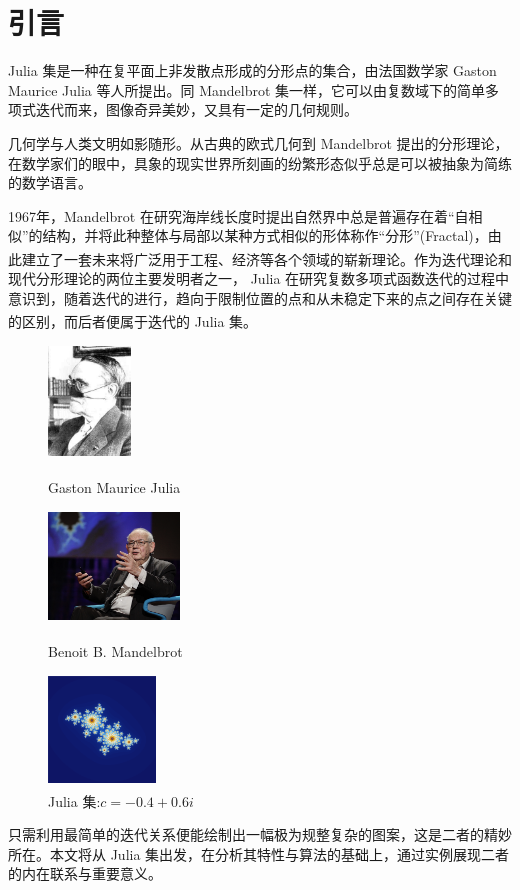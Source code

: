 \section{引言}

Julia 集是一种在复平面上非发散点形成的分形点的集合，由法国数学家 Gaston Maurice Julia 等人所提出。同 Mandelbrot 集一样，它可以由复数域下的简单多项式迭代而来，图像奇异美妙，又具有一定的几何规则。

几何学与人类文明如影随形。从古典的欧式几何到 Mandelbrot 提出的分形理论，在数学家们的眼中，具象的现实世界所刻画的纷繁形态似乎总是可以被抽象为简练的数学语言。

1967年，Mandelbrot 在研究海岸线长度时提出自然界中总是普遍存在着“自相似”的结构，并将此种整体与局部以某种方式相似的形体称作“分形”(Fractal)，由此建立了一套未来将广泛用于工程、经济等各个领域的崭新理论。\textsuperscript{\cite{enwiki-mandelbortset}}作为迭代理论和现代分形理论的两位主要发明者之一， Julia 在研究复数多项式函数迭代的过程中意识到，随着迭代的进行，趋向于限制位置的点和从未稳定下来的点之间存在关键的区别，而后者便属于迭代的 Julia 集。\textsuperscript{\cite{website-julia}}

\begin{figure}[htbp]
\centering
\begin{minipage}{0.3\linewidth}
\centering
\includegraphics[width = 2.2cm]{./images/julia.jpg}
\caption{Gaston Maurice Julia\textsuperscript{\cite{pic-julia}}}
\end{minipage}\hfill
\begin{minipage}{0.3\linewidth}
\centering
\includegraphics[width = 3.5cm]{./images/mandelbort.png}
\caption{Benoit B. Mandelbrot\textsuperscript{\cite{enwiki-mandelbort}}}
\end{minipage}\hfill
\begin{minipage}{0.35\linewidth}
\centering
\includegraphics[width = 2.85cm]{./images/julia_set_example.png}
\caption{Julia 集:$c=−0.4+0.6i$\textsuperscript{\cite{enwiki-juliaset}}}
\end{minipage}
\end{figure}

只需利用最简单的迭代关系便能绘制出一幅极为规整复杂的图案，这是二者的精妙所在。本文将从 Julia 集出发，在分析其特性与算法的基础上，通过实例展现二者的内在联系与重要意义。
